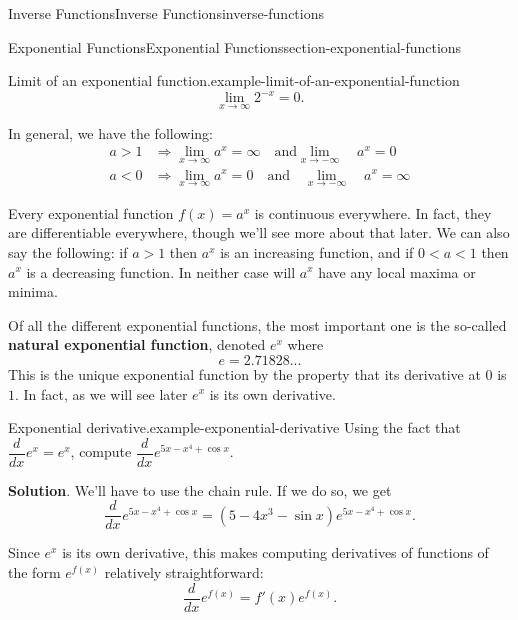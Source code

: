 \documentclass[oneside,10pt,]{book}
\newcommand{\terminology}[1]{\textbf{#1}}
\numberwithin{equation}{section}
\newcommand{\dv}[3][]{\dfrac{d^{#1} #2}{d #3^{#1}}}
\begin{document}
\begin{chapterptx}{Inverse Functions}{}{Inverse Functions}{}{}{inverse-functions}
\begin{sectionptx}{Exponential Functions}{}{Exponential Functions}{}{}{section-exponential-functions}
\begin{example}{Limit of an exponential function.}{example-limit-of-an-exponential-function}
\begin{equation*}
\lim_{x\to\infty}2^{-x} = 0.
\end{equation*}
%
\end{example}
\hypertarget{p-190}{}%
In general, we have the following:%
\begin{align*}
a > 1 & \Rightarrow \lim_{x\to\infty}a^{x} = \infty\quad\text{and}\lim_{x\to-\infty}\quad a^{x} = 0 \\
a < 0 & \Rightarrow \lim_{x\to\infty}a^{x} = 0\quad\text{and}\quad\lim_{x\to-\infty}\quad a^{x} = \infty 
\end{align*}
%
\par
\hypertarget{p-191}{}%
Every exponential function \(f(x) = a^{x}\) is continuous everywhere. In fact, they are differentiable everywhere, though we'll see more about that later. We can also say the following: if \(a > 1\) then \(a^{x}\) is an increasing function, and if \(0 < a < 1\) then \(a^{x}\) is a decreasing function. In neither case will \(a^{x}\) have any local maxima or minima.%
\par
\hypertarget{p-192}{}%
Of all the different exponential functions, the most important one is the so-called \terminology{natural exponential function}, denoted \(e^{x}\) where%
\begin{equation*}
e = 2.71828...
\end{equation*}
This is the unique exponential function by the property that its derivative at \(0\) is \(1\). In fact, as we will see later \(e^{x}\) is its own derivative.%
\begin{example}{Exponential derivative.}{example-exponential-derivative}%
\hypertarget{p-193}{}%
Using the fact that \(\dv{}{x}e^{x} = e^{x}\), compute \(\dv{}{x}e^{5x - x^{4} + \cos x}\).%
\par\smallskip%
\noindent\textbf{Solution}.\hypertarget{solution-43}{}\quad%
\hypertarget{p-194}{}%
We'll have to use the chain rule. If we do so, we get%
\begin{equation*}
\dv{}{x}e^{5x - x^{4} + \cos x} = (5 - 4x^{3} - \sin x)e^{5x - x^{4} + \cos x}.
\end{equation*}
%
\end{example}
\hypertarget{p-195}{}%
Since \(e^{x}\) is its own derivative, this makes computing derivatives of functions of the form \(e^{f(x)}\) relatively straightforward:%
\begin{equation*}
\dv{}{x}e^{f(x)} = f'(x)e^{f(x)}.
\end{equation*}
%
\par
\hypertarget{p-196}{}%

\end{sectionptx}
\end{chapterptx}
\end{document}

